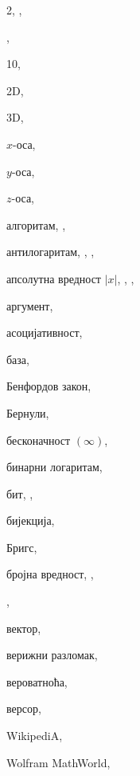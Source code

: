 \begin{theindex}

  \item 2, , 
  \item \4, 
  \item 10, 

  \interskip

  \item 2D, 
  \item 3D, 

  \indexspace

  \item $x$-оса, 
  \item $y$-оса, 
  \item $z$-оса, 

  \indexspace

  \item алгоритам, , 
  \item антилогаритам, , , 
  \item апсолутна вредност $\vert x\vert$, 
		, , 
  \item аргумент, 
  \item асоцијативност, 

  \indexspace

  \item база, 
  \item Бенфордов закон, 
  \item Бернули, 
  \item бесконачност $(\infty)$, 
  \item бинарни логаритам, 
  \item бит, , 
  \item бијекција, 
  \item Бригс, 
  \item бројна вредност, , 
  \interskip
  \item \BASIC, 

  \indexspace

  \item вектор, 
  \item верижни разломак, 
  \item вероватноћа, 
  \item версор, 
  \interskip
  \item {\sc  WikipediA}, 
  \item Wolfram MathWorld, 


\end{theindex}
